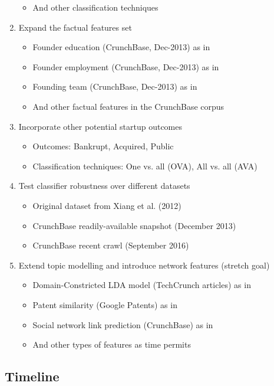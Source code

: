 \documentclass[../thesis/thesis.tex]{subfiles}
\begin{document}
\begin{enumerate}
\begin{itemize}
\item   And other classification techniques
\end{itemize}
\item Expand the factual features set
\begin{itemize}
\item   Founder education (CrunchBase, Dec-2013) as in \cite{beckwith2016}
\item   Founder employment (CrunchBase, Dec-2013) as in \cite{beckwith2016}
\item   Founding team (CrunchBase, Dec-2013) as in \cite{spiegel2013}
\item   And other factual features in the CrunchBase corpus
\end{itemize}
\item Incorporate other potential startup outcomes
\begin{itemize}
\item   Outcomes: Bankrupt, Acquired, Public
\item   Classification techniques: One vs. all (OVA), All vs. all (AVA)
\end{itemize}
\item Test classifier robustness over different datasets
\begin{itemize}
\item Original dataset from Xiang et al. (2012) \cite{xiang2012}
\item CrunchBase readily-available snapshot (December 2013)
\item CrunchBase recent crawl (September 2016)
\end{itemize}
\item Extend topic modelling and introduce network features (stretch goal)
\begin{itemize}
\item   Domain-Constricted LDA model (TechCrunch articles) as in \cite{yuan2016}
\item   Patent similarity (Google Patents) as in \cite{huang2015}
\item   Social network link prediction (CrunchBase) as in \cite{shi2014,yuxian2013}
\item   And other types of features as time permits
\end{itemize}
\end{enumerate}

\subsection*{Timeline}
\end{document}
